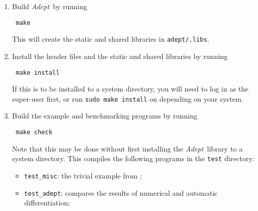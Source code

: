 \documentclass[a4,oneside]{book}
\def\codesize{\small}
\def\Adept{\emph{Adept}}
\def\code#1{{\codesize\texttt{#1}}}
\begin{document}
\begin{enumerate}
The \code{-g} option to \code{CXXFLAGS} ensures debugging information
is stored.  If a library you wish to use is installed in a non-system
directory, say under \code{/foo}, then specify the locations as
follows:
\begin{lstlisting}
 ./configure CPPFLAGS="-I/foo/include" LDFLAGS="-L/foo/lib -Wl,-rpath,/foo/lib"
\end{lstlisting}
where the \code{-rpath} business is needed in order that the
\Adept\ shared library knows where to look for the libraries it is
dependent on.  If you have them then for the benchmarking program you
can also add the non-system location of ADOL-C, CppAD and Sacado
libraries with additional \code{-I} and \code{-L} arguments, but note
that the \code{-rpath} argument is not needed in that case.  You can
see the more general options available by running \code{./configure
  --help}; for example, you can turn-off OpenMP parallelization in the
computation of Jacobian matrices using \code{--disable-openmp}.  See
also section \ref{sec:configuring} for ways to make more fundamental
changes to the configuration of \Adept.  The output from the
\code{configure} script provides information on aspects of how
\Adept\ and the test programs will be built.
\item Build \Adept\ by running
\begin{lstlisting}
 make
\end{lstlisting}
This will create the static and shared libraries in \code{adept/.libs}.
\item Install the header files and the static and shared libraries by
  running
\begin{lstlisting}
 make install
\end{lstlisting}
If this is to be installed to a system directory, you will need to log
in as the super-user first, or run \code{sudo make install} on
depending on your system.
\item Build the example and benchmarking programs by running
\begin{lstlisting}
 make check
\end{lstlisting}
Note that this may be done without first installing the
\Adept\ library to a system directory.  This compiles the following
programs in the \code{test} directory:
\begin{itemize}
\item\code{test\_misc}: the trivial example from \cite{Hogan2014};
\item\code{test\_adept}: compares the results of numerical and
  automatic differentiation;

\end{itemize}
\end{enumerate}
\end{document}
